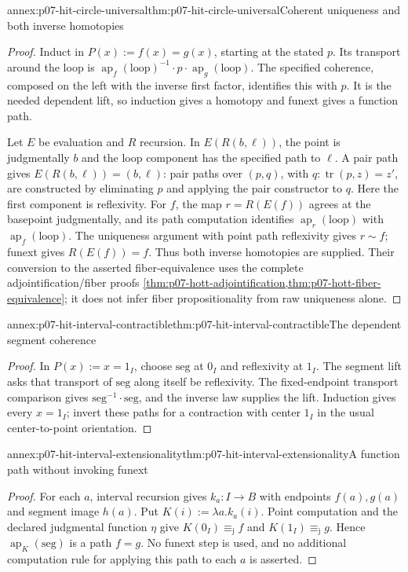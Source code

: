 \begin{annexitem}{annex:p07-hit-circle-universal}{thm:p07-hit-circle-universal}{Coherent uniqueness and both inverse homotopies}
\begin{proof}
Induct in \(P(x):=f(x)=g(x)\), starting at the stated \(p\).
Its transport around the loop is
\(\operatorname{ap}_f(\mathrm{loop})^{-1}\cdot p\cdot
\operatorname{ap}_g(\mathrm{loop})\). The specified coherence, composed
on the left with the inverse first factor, identifies this with \(p\).
It is the needed dependent lift, so induction gives a homotopy and funext
gives a function path.

Let \(E\) be evaluation and \(R\) recursion. In \(E(R(b,\ell))\),
the point is judgmentally \(b\) and the loop component has the specified
path to \(\ell\). A pair path gives \(E(R(b,\ell))=(b,\ell)\):
pair paths over \((p,q)\), with \(q:\operatorname{tr}(p,z)=z'\),
are constructed by eliminating \(p\) and applying the pair constructor
to \(q\). Here the first component is reflexivity.
For \(f\), the map \(r=R(E(f))\) agrees at the basepoint judgmentally,
and its path computation identifies \(\operatorname{ap}_r(\mathrm{loop})\)
with \(\operatorname{ap}_f(\mathrm{loop})\). The uniqueness argument with
point path reflexivity gives \(r\sim f\); funext gives \(R(E(f))=f\).
Thus both inverse homotopies are supplied. Their conversion to the asserted
fiber-equivalence uses the complete adjointification/fiber proofs
\cref{thm:p07-hott-adjointification,thm:p07-hott-fiber-equivalence}; it does
not infer fiber propositionality from raw uniqueness alone.
\end{proof}
\end{annexitem}

\begin{annexitem}{annex:p07-hit-interval-contractible}{thm:p07-hit-interval-contractible}{The dependent segment coherence}
\begin{proof}
In \(P(x):=x=1_I\), choose \(\mathrm{seg}\) at \(0_I\) and reflexivity
at \(1_I\). The segment lift asks that transport of \(\mathrm{seg}\)
along itself be reflexivity. The fixed-endpoint transport comparison gives
\(\mathrm{seg}^{-1}\cdot\mathrm{seg}\), and the inverse law supplies
the lift. Induction gives every \(x=1_I\); invert these paths for a
contraction with center \(1_I\) in the usual center-to-point orientation.
\end{proof}
\end{annexitem}

\begin{annexitem}{annex:p07-hit-interval-extensionality}{thm:p07-hit-interval-extensionality}{A function path without invoking funext}
\begin{proof}
For each \(a\), interval recursion gives \(k_a:I\to B\) with
endpoints \(f(a),g(a)\) and segment image \(h(a)\).
Put \(K(i):=\lambda a.k_a(i)\). Point computation and the declared
judgmental function \(\eta\) give \(K(0_I)\equiv_{\mathrm j}f\) and
\(K(1_I)\equiv_{\mathrm j}g\). Hence \(\operatorname{ap}_K(\mathrm{seg})\)
is a path \(f=g\). No funext step is used, and no additional computation
rule for applying this path to each \(a\) is asserted.
\end{proof}
\end{annexitem}

